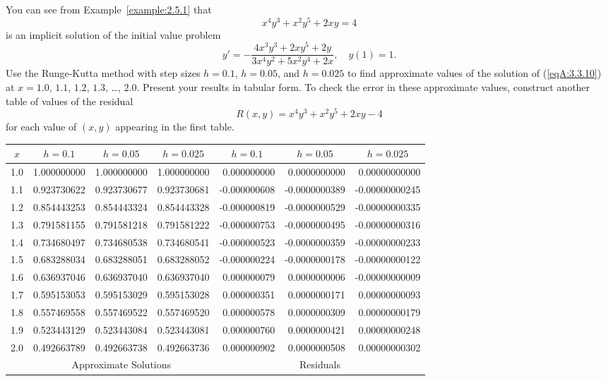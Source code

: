\documentclass{ximera}
\begin{document}
\begin{problem}\label{exer:3.3.10} 
You can see from Example~\ref{example:2.5.1} that
$$
x^4y^3+x^2y^5+2xy=4
$$
is an implicit solution of  the initial value problem
\begin{equation}\label{eqA:3.3.10}
y'=-\frac{4x^3y^3+2xy^5+2y}{3x^4y^2+5x^2y^4+2x},\quad y(1)=1.
\end{equation}
Use the Runge-Kutta method with step sizes $h=0.1$, $h=0.05$, and
$h=0.025$ to find approximate values of the solution of (\ref{eqA:3.3.10}) at
$x=1.0$, $1.1$, $1.2$, $1.3$, \dots, $2.0$. Present your results in tabular form.
To check the error in these approximate values, construct another
table of values of the residual
$$
R(x,y)=x^4y^3+x^2y^5+2xy-4
$$
for each value of $(x,y)$ appearing in the first table.

\begin{solution}
    {\small
\begin{tabular}{|c|r|r|r|r|r|r|}\hline
\multicolumn{1}{|c|}{$x$}&
\multicolumn{1}{|c|}{$h=0.1$}&
\multicolumn{1}{|c|}{$h=0.05$}&
\multicolumn{1}{|c|}{$h=0.025$}&
\multicolumn{1}{|c|}{$h=0.1$}&
\multicolumn{1}{|c|}{$h=0.05$}&
\multicolumn{1}{|c|}{$h=0.025$}\\ \hline
1.0 & 1.000000000 & 1.000000000 & 1.000000000 & 0.000000000 &  0.0000000000 &   0.00000000000\\
1.1 & 0.923730622 & 0.923730677 & 0.923730681 &-0.000000608 & -0.0000000389 &  -0.00000000245 \\
1.2 & 0.854443253 & 0.854443324 & 0.854443328 &-0.000000819 & -0.0000000529 &  -0.00000000335 \\
1.3 & 0.791581155 & 0.791581218 & 0.791581222 &-0.000000753 & -0.0000000495 &  -0.00000000316 \\
1.4 & 0.734680497 & 0.734680538 & 0.734680541 &-0.000000523 & -0.0000000359 &  -0.00000000233 \\
1.5 & 0.683288034 & 0.683288051 & 0.683288052 &-0.000000224 & -0.0000000178 &  -0.00000000122 \\
1.6 & 0.636937046 & 0.636937040 & 0.636937040 & 0.000000079 &  0.0000000006 &  -0.00000000009 \\
1.7 & 0.595153053 & 0.595153029 & 0.595153028 & 0.000000351 &  0.0000000171 &   0.00000000093 \\
1.8 & 0.557469558 & 0.557469522 & 0.557469520 & 0.000000578 &  0.0000000309 &   0.00000000179 \\
1.9 & 0.523443129 & 0.523443084 & 0.523443081 & 0.000000760 &  0.0000000421 &   0.00000000248 \\
2.0 & 0.492663789 & 0.492663738 & 0.492663736 & 0.000000902 &  0.0000000508 &   0.00000000302 \\
\hline
&\multicolumn{3}{c|}{Approximate Solutions}&
\multicolumn{3}{c|}{Residuals}\\\hline
\end{tabular}}
\end{solution}
\end{problem}
\end{document}
